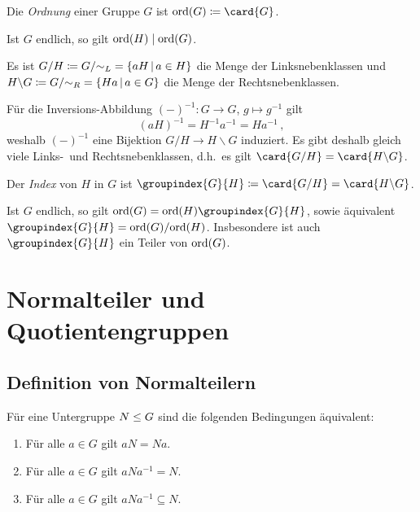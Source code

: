 \begin{definition}
  Die \emph{Ordnung} einer Gruppe $G$ ist $\ord{G} \defined \card{G}$.
\end{definition}

\begin{corollary}
  Ist $G$ endlich, so gilt $\operatorname{ord}(H) \mathrel{|} \operatorname{ord}(G)$.
\end{corollary}

\begin{definition}
  Es ist $G/H \defined G/{\sim_L} = \{aH \suchthat a \in H\}$ die Menge der Linksnebenklassen und $H \backslash G \defined G/{\sim_R} = \{Ha \suchthat a \in G\}$ die Menge der Rechtsnebenklassen.
\end{definition}


Für die Inversions-Abbildung $(-)^{-1} \colon G \to G$, $g \mapsto g^{-1}$ gilt
\[
    (aH)^{-1}
  = H^{-1} a^{-1}
  = H a^{-1} \,,
\]
weshalb $(-)^{-1}$ eine Bijektion $G/H \to H \backslash G$ induziert.
Es gibt deshalb gleich viele Links-\ und Rechtsnebenklassen, d.h.\ es gilt $\card{G/H} = \card{H \backslash G}$.

\begin{definition}
  Der \emph{Index} von $H$ in $G$ ist $\groupindex{G}{H} \defined \card{G/H} = \card{H \backslash G}$.
\end{definition}

\begin{corollary}
  Ist $G$ endlich, so gilt $\ord{G} = \ord{H} \groupindex{G}{H}$, sowie äquivalent $\groupindex{G}{H} = \ord{G}/{\ord{H}}$.
  Insbesondere ist auch $\groupindex{G}{H}$ ein Teiler von $\operatorname{ord}(G)$.
\end{corollary}





\section{Normalteiler und Quotientengruppen}



\subsection{Definition von Normalteilern}

Für eine Untergruppe $N \mathrel{\leq} G$ sind die folgenden Bedingungen äquivalent:

\begin{enumerate}
  \item
    Für alle $a \in G$ gilt $aN = Na$.
  \item
    Für alle $a \in G$ gilt $aNa^{-1} = N$.
  \item
    Für alle $a \in G$ gilt $aNa^{-1} \subseteq N$.
\end{enumerate}

